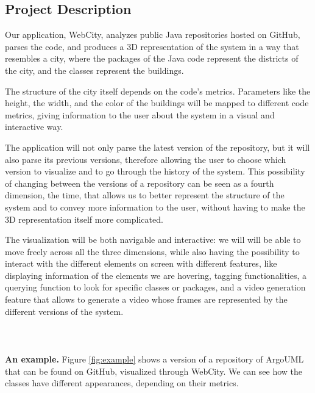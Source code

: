 \documentclass[]{usiinfbachelorproject}
\begin{document}
\subsection{Project Description} \label{Project Description}
Our application, WebCity, analyzes public Java repositories hosted on GitHub, parses the code, and produces a 3D representation of the system in a way that resembles a city, where the packages of the Java code represent the districts of the city, and the classes represent the buildings.

The structure of the city itself depends on the code's metrics. Parameters like the height, the width, and the color of the buildings will be mapped to different code metrics, giving information to the user about the system in a visual and interactive way.

The application will not only parse the latest version of the repository, but it will also parse its previous versions, therefore allowing the user to choose which version to visualize and to go through the history of the system. This possibility of changing between the versions of a repository can be seen as a fourth dimension, the time, that allows us to better represent the structure of the system and to convey more information to the user, without having to make the 3D representation itself more complicated.

The visualization will be both navigable and interactive: we will will be able to move freely across all the three dimensions, while also having the possibility to interact with the different elements on screen with different features, like displaying information of the elements we are hovering, tagging functionalities, a querying function to look for specific classes or packages, and a video generation feature that allows to generate a video whose frames are represented by the different versions of the system.\\\\\\\\

\textbf{An example.} Figure \ref{fig:example} shows a version of a repository of ArgoUML that can be found on GitHub, visualized through WebCity. We can see how the classes have different appearances, depending on their metrics.
\end{document}
